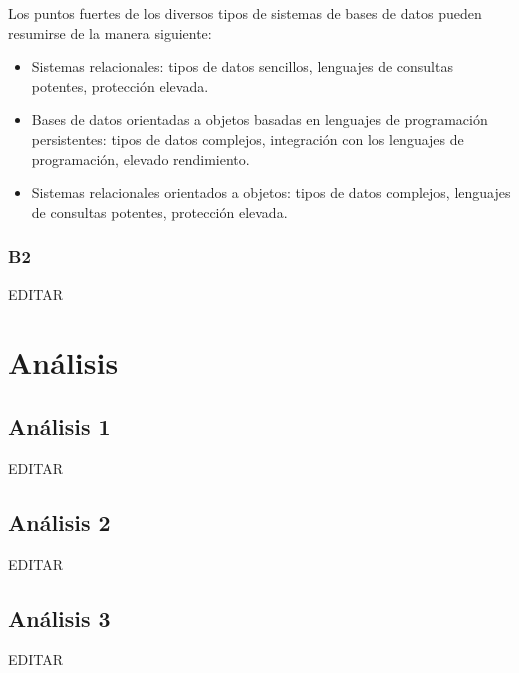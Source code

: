 \documentclass[preprint,12pt]{elsarticle}
\begin{document}
Los puntos fuertes de los diversos tipos de sistemas de bases de datos pueden resumirse de la manera siguiente:
\begin{itemize}
	\item Sistemas relacionales: tipos de datos sencillos, lenguajes de consultas potentes, protección elevada.
	\item Bases de datos orientadas a objetos basadas en lenguajes de programación persistentes: tipos de datos complejos, integración con los lenguajes de programación, elevado rendimiento.
	\item Sistemas relacionales orientados a objetos: tipos de datos complejos, lenguajes de consultas potentes, protección elevada.
\end{itemize}

\cite{SilberschatzKorthSudarshan2006}
\subsubsection{\textbf{B2}}

EDITAR\\







 



\section{Análisis}

\subsection{\textbf{Análisis 1}}
EDITAR\\

\subsection{\textbf{Análisis 2}}
EDITAR\\

\subsection{\textbf{Análisis 3}}
EDITAR\\
\end{document}
